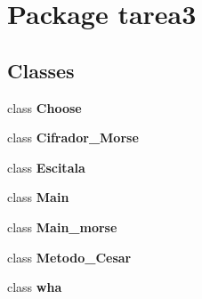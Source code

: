 \section{Package tarea3}
\label{namespacetarea3}
\subsection*{Classes}
\begin{DoxyCompactItemize}
\item 
class {\bf Choose}
\item 
class {\bf Cifrador\+\_\+\+Morse}
\item 
class {\bf Escitala}
\item 
class {\bf Main}
\item 
class {\bf Main\+\_\+morse}
\item 
class {\bf Metodo\+\_\+\+Cesar}
\item 
class {\bf wha}
\end{DoxyCompactItemize}
